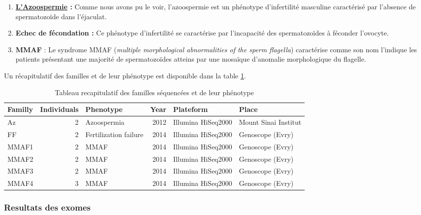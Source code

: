 \documentclass[12pt,twoside]{reedthesis}
\providecommand{\tightlist}{%
  \setlength{\itemsep}{0pt}\setlength{\parskip}{0pt}}
\theoremstyle{definition}
\theoremstyle{definition}
\theoremstyle{remark}
\begin{document}
  \begin{enumerate}
  \def\labelenumi{\arabic{enumi}.}
  \tightlist
  \item
    \textbf{\protect\hyperlink{infquant}{L'Azoospermie} :} Comme nous
    avons pu le voir, l'azoospermie est un phénotype d'infertilité
    masculine caractérisé par l'absence de spermatozoïde dans
    l'éjaculat.\\
  \item
    \textbf{Echec de fécondation :} Ce phénotype d'infertilité se
    caractérise par l'incapacité des spermatozoïdes à féconder
    l'ovocyte.\\
  \item
    \textbf{MMAF} : Le syndrome MMAF (\emph{multiple morphological
    abnormalities of the sperm flagella}) caractérise comme son nom
    l'indique les patients présentant une majorité de spermatozoïdes
    atteins par une mosaïque d'anomalie morphologique du flagelle.
  \end{enumerate}
  
  Un récapitulatif des familles et de leur phénotype est disponible dans
  la table \ref{tab:recapfam}.
  
  \begin{longtable}[t]{lrlrll}
  \caption{\label{tab:recapfam}Tableau recapitulatif des familles séquencées et de leur phénotype}\\
  \toprule
  Familly & Individuals & Phenotype & Year & Plateform & Place\\
  \midrule
  Az & 2 & Azoospermia & 2012 & Illumina HiSeq2000 & Mount Sinai Institut\\
  FF & 2 & Fertilization failure & 2014 & Illumina HiSeq2000 & Genoscope (Evry)\\
  MMAF1 & 2 & MMAF & 2014 & Illumina HiSeq2000 & Genoscope (Evry)\\
  MMAF2 & 2 & MMAF & 2014 & Illumina HiSeq2000 & Genoscope (Evry)\\
  MMAF3 & 2 & MMAF & 2014 & Illumina HiSeq2000 & Genoscope (Evry)\\
  MMAF4 & 3 & MMAF & 2014 & Illumina HiSeq2000 & Genoscope (Evry)\\
  \bottomrule
  \end{longtable}
  
  \subsubsection{Resultats des exomes}\label{resultats-des-exomes}
  
\end{document}
